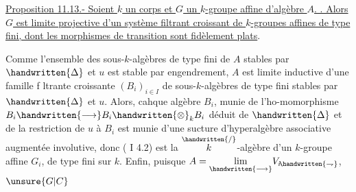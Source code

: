 \uline{Proposition 11.13.-  Soient $k$ un corps et $G$ un $k$-groupe affine d'algèbre $A$. . Alors $G$ est limite projective d'un système filtrant croissant de $k$-groupes affines de type fini, dont les morphismes de transition sont fidèlement plats}.

Comme l'ensemble des sous-$k$-algèbres de type fini de $A$ stables par $\handwritten{\Delta}$ et $u$ est stable par engendrement, $A$ est limite inductive d'une famille f ltrante croissante $(B_i)_{i\in I}$ de sous-$k$-algèbres de type fini stables par $\handwritten{\Delta}$ et $u$. Alors, cahque algèbre $B_i$, munie de l'ho-\linebreak momorphisme $B_i\handwritten{\longrightarrow}B_i\handwritten{\otimes}_k B_i$ déduit de $\handwritten{\Delta}$ et de la restriction de $u$ à $B_i$ est munie d'une sucture d'hyperalgèbre associative augmentée involutive, donc ( I 4.2) est la $\overset{\handwritten{/}}{k}$-algèbre d'un $k$-groupe affine $G_i$, de type fini sur $k$. Enfin, puisque $A=\underset{\handwritten{\longrightarrow}}{\lim}V_{i\!\handwritten{\rightharpoondown}}$,
$\unsure{G|C}$
